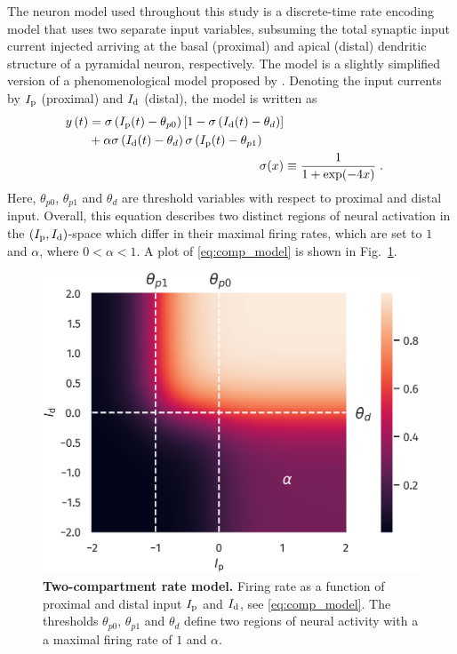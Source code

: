 \documentclass[10pt,a4paper,twocolumn]{article}
\begin{document}
		The neuron model used throughout this study is a discrete-time rate encoding model that
		uses two separate input variables, subsuming the total synaptic
		input current injected arriving at the basal (proximal) and apical (distal) 
		dendritic structure of a pyramidal neuron, respectively. The model is a slightly
		simplified version of a phenomenological model proposed by \citet{Shai_2015}.
		Denoting the input currents by $I_{\rm p}$ (proximal) and $I_{\rm d}$ (distal), 
		the model is written as
		\begin{align}
		\begin{split}
		y\left(t\right) &= \sigma\left( I_{\rm p}(t) - \theta_{p0} \right)
		\left[1-\sigma\left(I_{\rm d}(t) - \theta_d\right)\right] \\
		&+ \alpha \sigma\left(I_{\rm d}(t) - \theta_d \right)\sigma\left( I_{\rm p}(t) - \theta_{p1} \right)
		\end{split} \label{eq:comp_model}\\
		\sigma(x) &\equiv \frac{1}{1+\exp(-4x)} \; .
		\end{align}
		Here, $\theta_{p0}$, $\theta_{p1}$ and $\theta_d$ are threshold variables with
		respect to proximal and distal input. Overall, this equation describes two distinct
		regions of neural activation in the $(I_{\rm p}, I_{\rm d})$-space which differ in their
		maximal firing rates, which are set to $1$ and $\alpha$, where $0 < \alpha < 1$.
		A plot of \eqref{eq:comp_model} is shown in Fig.~\ref{fig:comp_model}.
		\begin{figure}
			\centering
			\includegraphics[width=0.8\columnwidth]{plot_comp_mod_marks.png}
			\caption{{\bf Two-compartment rate model.} Firing rate as a
			function of proximal and distal input $I_{\rm p}$ and $I_{\rm d}$, 
			see \eqref{eq:comp_model}. 
			The thresholds $\theta_{p0}$, $\theta_{p1}$ and $\theta_d$ define
			two regions of neural activity with a a maximal firing rate of $1$
			and $\alpha$.}
			\label{fig:comp_model}
		\end{figure}
		
\end{document}
